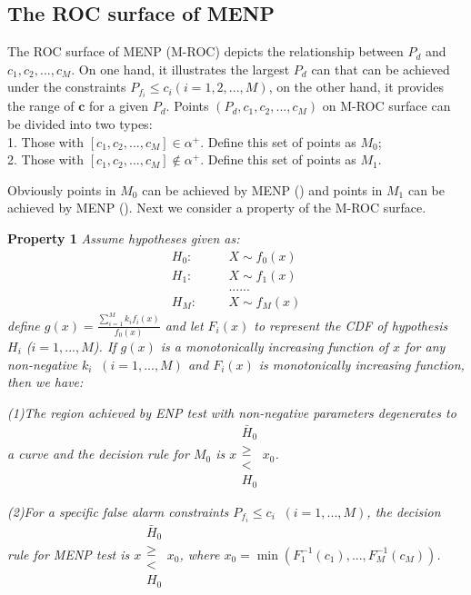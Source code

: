 \documentclass[12pt,journal,a4paper,twoside,onecolumn]{IEEEtran}
\newcommand{\rmnum}[1]{\romannumeral #1}
\begin{document}
\begin{spacing}{2.5}
\section{The ROC surface of MENP}

The ROC surface of MENP (M-ROC) depicts the relationship between $P_d$ and $c_1, c_2, ..., c_M$. On one hand, it  illustrates the largest $P_d$ can that can be achieved under the constraints $P_{f_i} \leq c_i (i = 1, 2, ..., M)$, on the other hand, it provides the range of $\mathbf{c}$ for a given $P_d$.
Points $(P_d, c_1, c_2, ..., c_M)$ on M-ROC  surface can be divided into two types: 
\\1. Those with $[c_1, c_2, ..., c_M] \in \alpha^+$. Define this set of points as $M_0$; 
\\2. Those with $[c_1, c_2, ..., c_M] \notin \alpha^+$. Define this set of points as $M_1$. 

Obviously points in $M_0$ can be achieved by MENP (\rmnum{1}) and points in $M_1$ can  be achieved by MENP (\rmnum{2}). Next we consider a property of the M-ROC surface.

\noindent \textbf{Property 1}
\noindent \textit{
  \noindent Assume hypotheses given as:
}
\begin{equation}
\begin{split}
H_0:\;\;\;\;\;\;&X \sim f_0(x)\\
H_1:\;\;\;\;\;\;&X \sim f_1(x)\\
  &......\\
H_M:\;\;\;\;\;\;&X \sim f_M(x)
\end{split}
\end{equation}
\textit{
  define $g(x) = \frac{\sum_{i=1}^{M}k_if_i(x)}{f_0(x)}$ and let $F_i(x)$ to represent the CDF of hypothesis $H_i$ ($i = 1, ..., M$). If $g(x)$ is a monotonically increasing function of $x$ for any non-negative $k_i\;\;(i = 1, ..., M)$ and $F_i(x)$ is monotonically increasing function, then we have:}
  
\textit{(1)The region achieved by ENP test with non-negative parameters degenerates to a curve and the decision rule for $M_0$ is $x \substack{\bar{H}_0 \\ \geq \\ < \\H_0} x_0$.}

\textit{(2)For a specific false alarm constraints $P_{f_i} \leq c_i\;\;(i = 1, ..., M)$, the decision rule for MENP test is $x \substack{\bar{H}_0 \\ \geq \\ < \\H_0} x_0$, where $x_0 = \min(F_1^{-1}(c_1), ..., F_M^{-1}(c_M))$.}


\end{spacing}
\end{document}
